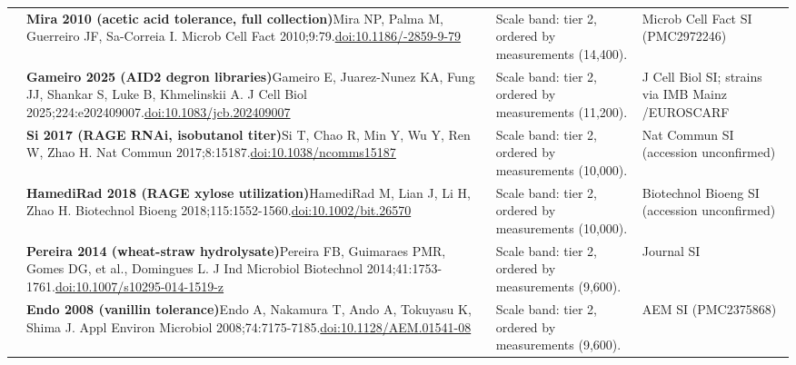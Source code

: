 \begin{landscape}
\begin{longtable}{@{}r@{\hspace{4pt}} L{86mm} L{92mm} L{62mm}@{}}
 & \textbf{Mira 2010 (acetic acid tolerance, full collection)}\newline Mira NP, Palma M, Guerreiro JF, Sa-Correia I. Microb Cell Fact 2010;9:79.\newline \href{https://doi.org/10.1186/1475-2859-9-79}{doi:10.1186/-2859-9-79} & Scale band: tier 2, ordered by measurements (14,400). & Microb Cell Fact SI (PMC2972246) \\
 & \textbf{Gameiro 2025 (AID2 degron libraries)}\newline Gameiro E, Juarez-Nunez KA, Fung JJ, Shankar S, Luke B, Khmelinskii A. J Cell Biol 2025;224:e202409007.\newline \href{https://doi.org/10.1083/jcb.202409007}{doi:10.1083/\allowbreak jcb.202409007} & Scale band: tier 2, ordered by measurements (11,200). & J Cell Biol SI; strains via IMB Mainz /\allowbreak  EUROSCARF \\
 & \textbf{Si 2017 (RAGE RNAi, isobutanol titer)}\newline Si T, Chao R, Min Y, Wu Y, Ren W, Zhao H. Nat Commun 2017;8:15187.\newline \href{https://doi.org/10.1038/ncomms15187}{doi:10.1038/\allowbreak ncomms15187} & Scale band: tier 2, ordered by measurements (10,000). & Nat Commun SI (accession unconfirmed) \\
 & \textbf{HamediRad 2018 (RAGE xylose utilization)}\newline HamediRad M, Lian J, Li H, Zhao H. Biotechnol Bioeng 2018;115:1552-1560.\newline \href{https://doi.org/10.1002/bit.26570}{doi:10.1002/\allowbreak bit.26570} & Scale band: tier 2, ordered by measurements (10,000). & Biotechnol Bioeng SI (accession unconfirmed) \\
 & \textbf{Pereira 2014 (wheat-straw hydrolysate)}\newline Pereira FB, Guimaraes PMR, Gomes DG, et al., Domingues L. J Ind Microbiol Biotechnol 2014;41:1753-1761.\newline \href{https://doi.org/10.1007/s10295-014-1519-z}{doi:10.1007/\allowbreak s10295-014-1519-z} & Scale band: tier 2, ordered by measurements (9,600). & Journal SI \\
 & \textbf{Endo 2008 (vanillin tolerance)}\newline Endo A, Nakamura T, Ando A, Tokuyasu K, Shima J. Appl Environ Microbiol 2008;74:7175-7185.\newline \href{https://doi.org/10.1128/AEM.01541-08}{doi:10.1128/\allowbreak AEM.01541-08} & Scale band: tier 2, ordered by measurements (9,600). & AEM SI (PMC2375868) \\

\end{longtable}
\end{landscape}
